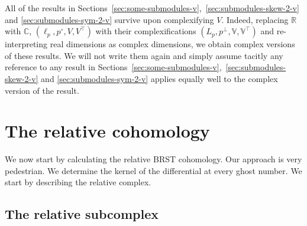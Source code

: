 \documentclass[11pt,reqno,a4paper,final]{amsart}
\theoremstyle{plain}
\theoremstyle{definition}
\newcommand{\VV}{\mathbb{V}}
\newcommand{\RR}{\mathbb{R}}
\newcommand{\CC}{\mathbb{C}}
\newcommand{\1}{\mathbb{1}}
\numberwithin{equation}{section}
\begin{document}
All of the results in
Sections~\ref{sec:some-submodules-v},~\ref{sec:submodules-skew-2-v} and
\ref{sec:submodules-sym-2-v} survive upon complexifying $V$.  Indeed,
replacing $\RR$ with $\CC$, $(\ell_p, p^\circ,V,V^\top)$ with their
complexifications $(L_p, p^\perp, \VV,\VV^\top)$ and re-interpreting
real dimensions as complex dimensions, we obtain complex versions of
these results.  We will not write them again and simply assume tacitly
any reference to any result in
Sections~\ref{sec:some-submodules-v},~\ref{sec:submodules-skew-2-v}
and \ref{sec:submodules-sym-2-v} applies equally well to the complex
version of the result.

\section{The relative cohomology}
\label{sec:relative-cohomology}

We now start by calculating the relative BRST cohomology. Our approach
is very pedestrian. We determine the kernel of the differential at
every ghost number.  We start by describing the relative complex.

\subsection{The relative subcomplex}
\label{sec:relative-subcomplex}
\end{document}
